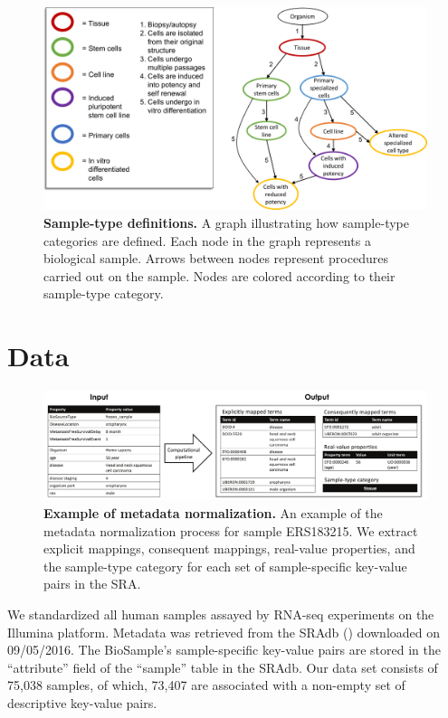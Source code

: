 \begin{figure}[htbp]
\includegraphics[width=13cm]{figures/sample_type_definition.png}  
\caption{\textbf{Sample-type definitions.} A graph illustrating how sample-type categories are defined. Each node in the graph represents a biological sample.  Arrows between nodes represent procedures carried out on the sample.  Nodes are colored according to their sample-type category.}
\label{fig:sample_type_def}
\end{figure}





\section{Data}

\begin{figure}[!tpb]
\centerline{\includegraphics[width=13cm]{figures/project_flow.pdf}}
\caption{\textbf{Example of metadata normalization.} An example of the metadata normalization process for sample ERS183215. We extract explicit mappings, consequent mappings, real-value properties, and the sample-type category for each set of sample-specific key-value pairs in the SRA.}
\label{fig:project_flow}
\end{figure}

We standardized all human samples assayed by RNA-seq experiments on the Illumina platform.  Metadata was retrieved from the SRAdb (\citealp{Yuelin}) downloaded on 09/05/2016.  The BioSample's sample-specific key-value pairs are  stored in the ``attribute'' field of the ``sample'' table in the SRAdb.  Our data set consists of 75,038 samples, of which, 73,407 are associated with a non-empty set of descriptive key-value pairs.

